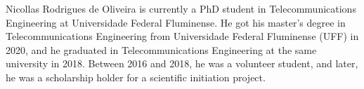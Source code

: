 \documentclass{ieeeaccess}
\begin{document}






\begin{IEEEbiography}{Nicollas Rodrigues de Oliveira} is currently a PhD student in Telecommunications Engineering at Universidade Federal Fluminense. He got his master's degree in Telecommunications Engineering from Universidade Federal Fluminense (UFF) in 2020, and he graduated in Telecommunications Engineering at the same university in 2018. Between 2016 and 2018, he was a volunteer student, and later, he was a scholarship holder for a scientific initiation project. 
\end{IEEEbiography}
\end{document}
